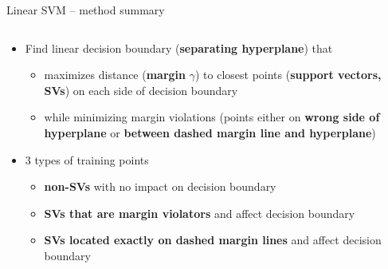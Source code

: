 \begin{vbframe}{Linear SVM -- method summary}
       
\medskip



\begin{columns}[T]
\begin{column}{0.7\linewidth}
\begin{itemize}
\item Find linear decision boundary (\textbf{separating hyperplane}) that 
\begin{itemize}
    \item maximizes distance (\textbf{margin} $\gamma$) to closest points (\textbf{support vectors, SVs}) on each side of decision boundary
    \item while minimizing margin violations (points either on \textbf{wrong side of hyperplane} or \textbf{between dashed margin line and hyperplane})
\end{itemize}
  \item 3 types of training points
  \begin{itemize}
    \item \textbf{non-SVs} with no impact on decision boundary
    \item \textbf{SVs that are margin violators} and affect decision boundary
    \item \textbf{SVs located exactly on dashed margin lines} and affect decision boundary
  \end{itemize}
\end{itemize}



\end{column}
\end{columns}
\end{vbframe}
